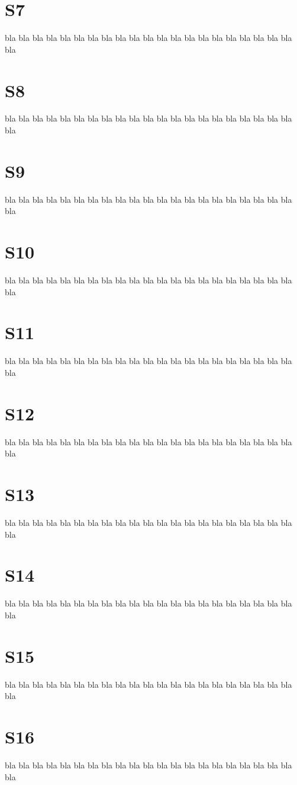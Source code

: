 \documentclass[12pt,a4paper]{book}
\begin{document}
\section{S7}
bla bla bla bla bla bla bla bla bla bla bla
bla bla bla bla bla bla bla bla bla bla bla
\section{S8}
bla bla bla bla bla bla bla bla bla bla bla
bla bla bla bla bla bla bla bla bla bla bla
\section{S9}
bla bla bla bla bla bla bla bla bla bla bla
bla bla bla bla bla bla bla bla bla bla bla
\section{S10}
bla bla bla bla bla bla bla bla bla bla bla
bla bla bla bla bla bla bla bla bla bla bla
\section{S11}
bla bla bla bla bla bla bla bla bla bla bla
bla bla bla bla bla bla bla bla bla bla bla
\section{S12}
bla bla bla bla bla bla bla bla bla bla bla
bla bla bla bla bla bla bla bla bla bla bla
\section{S13}
bla bla bla bla bla bla bla bla bla bla bla
bla bla bla bla bla bla bla bla bla bla bla
\section{S14}
bla bla bla bla bla bla bla bla bla bla bla
bla bla bla bla bla bla bla bla bla bla bla
\section{S15}
bla bla bla bla bla bla bla bla bla bla bla
bla bla bla bla bla bla bla bla bla bla bla
\section{S16}
bla bla bla bla bla bla bla bla bla bla bla
bla bla bla bla bla bla bla bla bla bla bla
\end{document}
